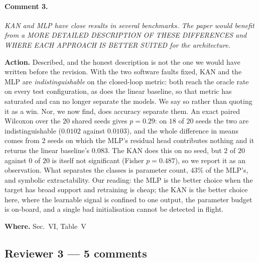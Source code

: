 \documentclass[10pt]{article}
\newcommand{\rev}[1]{\par\medskip\noindent\textit{#1}\par\smallskip}
\newcommand{\act}[2]{\noindent\textbf{Action.} #1\par\noindent\textbf{Where.} #2\par}
\begin{document}
\paragraph{Comment 3.}
\rev{KAN and MLP have close results in several benchmarks. The paper would benefit from a MORE DETAILED DESCRIPTION OF THESE DIFFERENCES and WHERE EACH APPROACH IS BETTER SUITED for the architecture.}
\act{Described, and the honest description is not the one we would have written before the revision. With the two software faults fixed, KAN and the MLP are \emph{indistinguishable} on the closed-loop metric: both reach the oracle rate on every test configuration, as does the linear baseline, so that metric has saturated and can no longer separate the models. We say so rather than quoting it as a win. Nor, we now find, does accuracy separate them. An exact paired Wilcoxon over the $20$ shared seeds gives $p=0.29$: on $18$ of $20$ seeds the two are indistinguishable ($0.0102$ against $0.0103$), and the whole difference in means comes from $2$ seeds on which the MLP's residual head contributes nothing and it returns the linear baseline's $0.083$. The KAN does this on no seed, but $2$ of $20$ against $0$ of $20$ is itself not significant (Fisher $p=0.487$), so we report it as an observation. What separates the classes is parameter count, $43\%$ of the MLP's, and symbolic extractability. Our reading: the MLP is the better choice when the target has broad support and retraining is cheap; the KAN is the better choice here, where the learnable signal is confined to one output, the parameter budget is on-board, and a single bad initialisation cannot be detected in flight.}{Sec.~VI, Table~V}

\subsection*{Reviewer 3 --- 5 comments}
\end{document}
